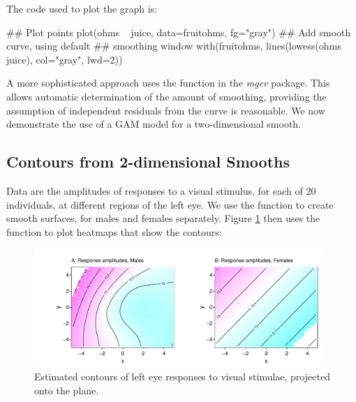 The code used to plot the graph is:
\begin{Schunk}
\begin{Sinput}
## Plot points
plot(ohms ~ juice, data=fruitohms, fg="gray")
## Add smooth curve, using default
## smoothing window
with(fruitohms,
     lines(lowess(ohms ~ juice), col="gray", lwd=2))
\end{Sinput}
\end{Schunk}

A more sophisticated approach uses the  function
in the {\em mgcv} package.  This allows automatic determination of the
amount of smoothing, providing the assumption of independent residuals
from the curve is reasonable.  We now demonstrate the use of a GAM
model for a two-dimensional smooth.

\subsection{Contours from 2-dimensional Smooths}
Data are the amplitudes of responses to a visual stimulus, for each of
20 individuals, at different regions of the left eye.  We use the
function  to create smooth
surfaces, for males and females separately. Figure \ref{fig:visAmp}
then uses the function  to plot heatmaps that show the
contours:
\begin{fullwidth}
\begin{figure}
\begin{Schunk}


\centerline{\includegraphics[width=0.97\textwidth]{figs/8-plotVIS-1} }

\end{Schunk}
\vspace*{-7pt}
\caption{Estimated contours of left eye responses to visual stimulae,
projected onto the plane.\label{fig:visAmp}}
\vspace*{15pt}
\end{figure}
\end{fullwidth}
\enlargethispage{12pt}

